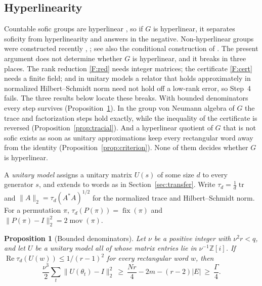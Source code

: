 \documentclass[11pt]{article}
\newtheorem{proposition}[theorem]{Proposition}
\theoremstyle{definition}
\theoremstyle{remark}
\numberwithin{equation}{section}
\DeclareMathOperator{\tr}{tr}
\DeclareMathOperator{\fix}{fix}
\DeclareMathOperator{\mov}{mov}
\newcommand{\Z}{\mathbb Z}
\begin{document}
\subsection{Hyperlinearity}\label{sec:hyperlinear}

Countable sofic groups are hyperlinear \cite[Theorem~2]{ElekSzabo2005}, so if $G$ is hyperlinear, it separates soficity from hyperlinearity and answers \cite[Open question~3.4]{Pestov2008} in the negative. Non-hyperlinear groups were constructed recently \cite[Corollary~C]{ALT26}, \cite[Theorem~1.4]{SauerSchesler26}; see also the conditional construction of \cite{Thom26}. The present argument does not determine whether $G$ is hyperlinear, and it breaks in three places. The rank reduction \ref{F:red} needs integer matrices; the certificate \ref{F:cert} needs a finite field; and in unitary models a relator that holds approximately in normalized Hilbert--Schmidt norm need not hold off a low-rank error, so Step~4 fails. The three results below locate these breaks. With bounded denominators every step survives (Proposition~\ref{prop:height}). In the group von Neumann algebra of $G$ the trace and factorization steps hold exactly, while the inequality of the certificate is reversed (Proposition~\ref{prop:tracial}). And a hyperlinear quotient of $G$ that is not sofic exists as soon as unitary approximations keep every rectangular word away from the identity (Proposition~\ref{prop:criterion}). None of them decides whether $G$ is hyperlinear.

A \emph{unitary model} assigns a unitary matrix $U(s)$ of some size $d$ to every generator $s$, and extends to words as in Section~\ref{sec:transfer}. Write $\tau_d=\frac1d\tr$ and $\|A\|_2=\tau_d(A^*A)^{1/2}$ for the normalized trace and Hilbert--Schmidt norm. For a permutation $\pi$, $\tau_d(P(\pi))=\fix(\pi)$ and $\|P(\pi)-I\|_2^2=2\mov(\pi)$.

\begin{proposition}[Bounded denominators]\label{prop:height}
Let $\nu$ be a positive integer with $\nu^2r<q$, and let $U$ be a unitary model all of whose matrix entries lie in $\nu^{-1}\Z[i]$. If $\operatorname{Re}\tau_d(U(w))\le1/(r-1)^2$ for every rectangular word $w$, then
\[
 \frac{\nu^3}{2}\sum_t\|U(\theta_t)-I\|_2^2\ \ge\ \frac{Nr}{4}-2m-(r-2)|E|\ \ge\ \frac\Gamma4.
\]
\end{proposition}
\end{document}
